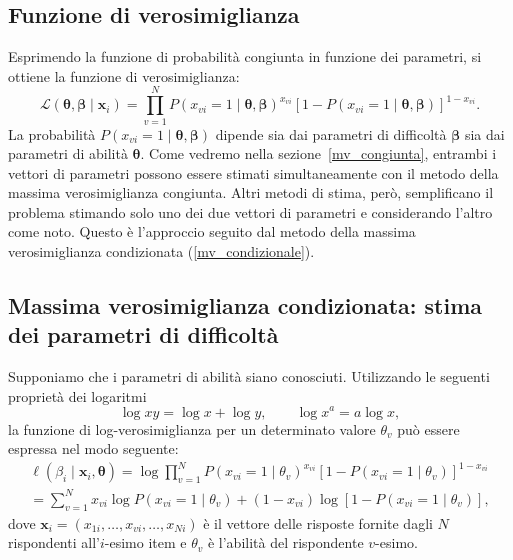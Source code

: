 \subsection{Funzione di verosimiglianza}

Esprimendo la funzione di probabilità congiunta in funzione dei parametri, si ottiene la funzione di verosimiglianza:
\begin{equation}
\mathcal{L}(\boldsymbol{\theta},  \boldsymbol{\beta} \mid \boldsymbol{x}_i) = \prod_{v=1}^N  P(x_{vi}=1 \mid \boldsymbol{\theta},  \boldsymbol{\beta})^{x_{vi}} [1- P(x_{vi}=1 \mid \boldsymbol{\theta}, \boldsymbol{\beta})]^{1-x_{vi}}.
\end{equation}
La probabilità $P(x_{vi}=1 \mid \boldsymbol{\theta}, \boldsymbol{\beta})$ dipende sia dai parametri di difficoltà $\boldsymbol{\beta}$ sia dai parametri di abilità $\boldsymbol{\theta}$. Come vedremo nella sezione~\ref{mv_congiunta}, entrambi i vettori di parametri possono essere stimati simultaneamente con il metodo della massima verosimiglianza  congiunta. Altri metodi di stima, però, semplificano il problema stimando solo uno dei due vettori di parametri e considerando l'altro come noto.  Questo è l'approccio seguito dal metodo della massima verosimiglianza condizionata (\ref{mv_condizionale}).  

\subsection{Massima verosimiglianza condizionata: stima dei parametri di difficoltà}

Supponiamo che i parametri di abilità siano conosciuti. 
Utilizzando le seguenti proprietà dei logaritmi
$$
\log xy = \log x + \log y, \qquad \log x^a=a \log x,
$$
\noindent
la funzione di log-verosimiglianza per un determinato valore $\theta_v$ può essere espressa nel modo seguente:
\begin{multline}
 \ell (\beta_i \mid \boldsymbol{x}_i, \boldsymbol{\theta}) 
= \log \prod_{v=1}^N  P(x_{vi}=1 \mid \theta_v)^{x_{vi}} [1- P(x_{vi}=1 \mid \theta_v)]^{1-x_{vi}} \\
= \sum_{v=1}^N x_{vi}\log  P(x_{vi}=1 \mid \theta_v) + (1-x_{vi})\log[1- P(x_{vi}=1 \mid \theta_v)],    
\label{likeRasch}
\end{multline}
\noindent
dove $\boldsymbol{x}_i = (x_{1i}, \dots, x_{vi}, \dots, x_{Ni})$ è il vettore   delle risposte fornite dagli $N$ rispondenti  all'$i$-esimo item e $\theta_v$ è l'abilità del rispondente $v$-esimo.  

